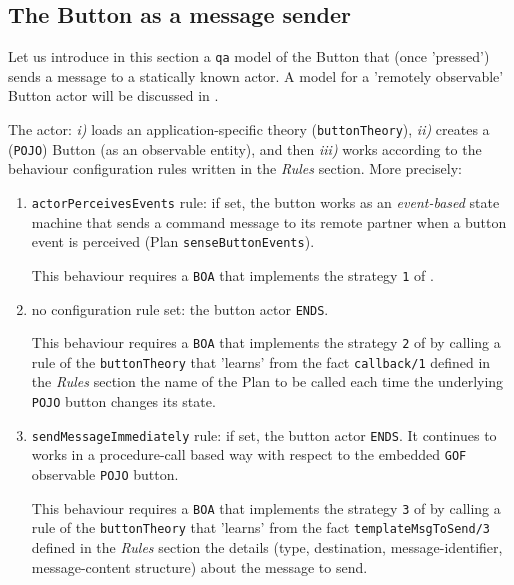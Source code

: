 \subsection{The Button as a message sender}

Let us introduce in this section a \texttt{qa} model of the Button that (once 'pressed') sends a message to a statically known actor. A model for a  'remotely observable' Button actor will be discussed in .

 



The actor: \textit{i)} loads an application-specific theory (\texttt{buttonTheory}), \textit{ii)} creates a (\texttt{POJO}) Button (as an observable entity), and then \textit{iii)} works according to the behaviour configuration rules written in the \textit{Rules} section. More precisely:
\begin{enumerate}
\item \texttt{actorPerceivesEvents} rule: if set, the button works as an \textit{event-based} state machine that sends a command message to its remote partner when a button event is perceived (Plan \texttt{senseButtonEvents}).

This behaviour requires a \texttt{BOA} that implements the strategy \texttt{1} of .

\item no configuration rule set: the button actor \texttt{ENDS}. 

This behaviour requires a \texttt{BOA} that implements the strategy \texttt{2} of   by calling a rule of the  \texttt{buttonTheory} that 'learns' from the fact \texttt{callback/1} defined in the \textit{Rules} section the name of the Plan to be called each time the underlying \texttt{POJO} button changes its state.

\item \texttt{sendMessageImmediately} rule: if set, the button actor \texttt{ENDS}. It continues to works in a procedure-call based way with respect to the embedded \texttt{GOF} observable \texttt{POJO} button. 

This behaviour requires a \texttt{BOA} that implements the strategy \texttt{3} of   by calling a rule of the  \texttt{buttonTheory} that 'learns' from the fact \texttt{templateMsgToSend/3} defined in the \textit{Rules} section the details (type, destination, message-identifier, message-content structure) about the message to send.

\end{enumerate}


